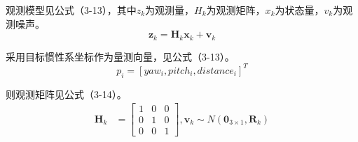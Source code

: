 观测模型见公式（3-13），其中$z_k$为观测量，$H_k$为观测矩阵，$x_k$为状态量，$v_k$为观测噪声。
\begin{equation} \boldsymbol  z_{k} = \boldsymbol H_k\boldsymbol x_k + \boldsymbol {v}_{k} \end{equation}
\par
采用目标惯性系坐标作为量测向量，见公式（3-13）。
\begin{equation} p_i = [yaw_i,pitch_i,distance_i]^T \end{equation} 
\par
则观测矩阵见公式（3-14）。
\begin{equation} \begin{aligned} \boldsymbol H_k &=  \left[\begin{array}{cccccc} 1 & 0 &0    \\ 0  &1 &0  \\ 0 &0  &1   \end{array}\right],\boldsymbol {v}_{k} \sim N\left(\boldsymbol 0_{3 \times 1}, \boldsymbol {R}_k\right) \end{aligned} \end{equation}
\par



